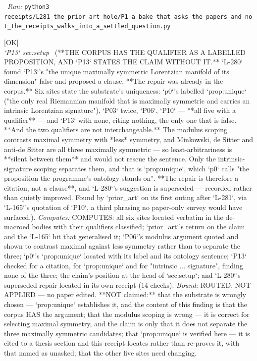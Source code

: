 \begin{description}
\ \emph{Run:} \texttt{python3 receipts/L281\_the\_prior\_art\_hole/P1\_a\_bake\_that\_asks\_the\_papers\_and\_not\_the\_receipts\_walks\_into\_a\_settled\_question.py}
\item[\label{rcpt:Q1_the_corpus_has_the_qualifier_as_a_labelled_proposition_and_P13_states_the_claim_without_it}\texttt{Q1\_the\_corpus\_has\_the\_qualifier\_as\_a\_labelled\_proposition\_and\_P13\_states\_the\_claim\_without\_it}]\hfill\textsf{[OK]}\\
\textit{`P13` sec:setup} \ (**THE CORPUS HAS THE QUALIFIER AS A LABELLED PROPOSITION, AND `P13` STATES THE CLAIM WITHOUT IT.** `L-280` found `P13`'s "the unique maximally symmetric Lorentzian manifold of its dimension" false and proposed a clause. **The repair was already in the corpus.** Six sites state the substrate's uniqueness: `p0`'s labelled `prop:unique` ("the only real Riemannian manifold that is maximally symmetric and carries an intrinsic Lorentzian signature"), `P03` twice, `P06`, `P10` --- **all five with a qualifier** --- and `P13` with none, citing nothing, the only one that is false. **And the two qualifiers are not interchangeable.** The modulus scoping contrasts maximal symmetry with *less* symmetry, and Minkowski, de Sitter and anti-de Sitter are all three maximally symmetric --- so least-arbitrariness is **silent between them** and would not rescue the sentence. Only the intrinsic-signature scoping separates them, and that is `prop:unique`, which `p0` calls "the proposition the programme's ontology stands on". **The repair is therefore a citation, not a clause**, and `L-280`'s suggestion is superseded --- recorded rather than quietly improved. Found by `prior\_art` on its first outing after `L-281`, via `L-165`'s quotation of `P10`, a third phrasing no paper-only survey would have surfaced.). 
\emph{Computes:} COMPUTES: all six sites located verbatim in the de-macroed bodies with their qualifiers classified; `prior\_art`'s return on the claim and the `L-165` hit that generalised it; `P06`'s modulus argument quoted and shown to contrast maximal against less symmetry rather than to separate the three; `p0`'s `prop:unique` located with its label and its ontology sentence; `P13` checked for a citation, for `prop:unique` and for "intrinsic ... signature", finding none of the three; the claim's position at the head of `sec:setup`; and `L-280`'s superseded repair located in its own receipt (14 checks).
 \emph{Bound:} ROUTED, NOT APPLIED --- no paper edited. **NOT claimed:** that the substrate is wrongly chosen --- `prop:unique` establishes it, and the content of this finding is that the corpus HAS the argument; that the modulus scoping is wrong --- it is correct for selecting maximal symmetry, and the claim is only that it does not separate the three maximally symmetric candidates; that `prop:unique` is verified here --- it is cited to a thesis section and this receipt locates rather than re-proves it, with that named as unasked; that the other five sites need changing.

\end{description}
